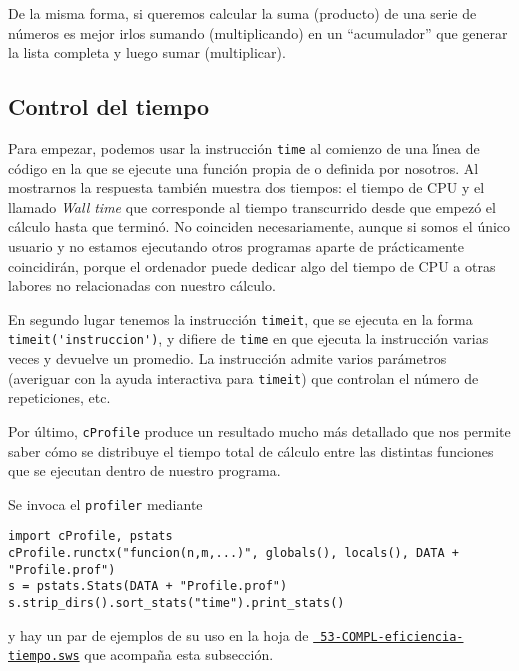 De la misma forma, si queremos calcular la suma (producto) de una serie de
n\'umeros es mejor irlos sumando (multiplicando) en un ``acumulador'' que
generar la lista
completa y luego sumar (multiplicar). 
 
 \subsection{Control del tiempo}\label{time}

Para empezar, podemos usar la instrucción \lstinline|time| al comienzo de una
l\'{\i}nea de c\'odigo en la que se ejecute una funci\'on propia de {\sage} o
definida por nosotros. Al mostrarnos la respuesta también muestra dos
tiempos: el tiempo de CPU y el llamado {\itshape Wall time} que corresponde al
tiempo transcurrido desde que empez\'o el c\'alculo hasta que termin\'o. No
coinciden necesariamente, aunque si somos el \'unico usuario y no estamos
ejecutando otros programas aparte de {\sage} pr\'acticamente coincidir\'an,  
porque el ordenador puede dedicar algo del tiempo de CPU a otras labores no
relacionadas con nuestro c\'alculo.




En segundo lugar tenemos la instrucci\'on \lstinline|timeit|, que se ejecuta en
la
forma 
\lstinline|timeit('instruccion')|, y difiere de \lstinline|time| en que ejecuta
la
instrucci\'on
varias veces y devuelve un promedio. La instrucci\'on admite varios par\'ametros
(averiguar con la ayuda interactiva para \lstinline|timeit|) que controlan el
n\'umero de
repeticiones, etc.

Por \'ultimo, \lstinline|cProfile| produce un resultado mucho m\'as detallado
que nos
permite saber 
c\'omo se distribuye el tiempo total de c\'alculo entre las distintas funciones
que se ejecutan dentro de nuestro programa. 



Se invoca el {\tt profiler} mediante

\begin{lstlisting}
import cProfile, pstats
cProfile.runctx("funcion(n,m,...)", globals(), locals(), DATA + "Profile.prof")
s = pstats.Stats(DATA + "Profile.prof")
s.strip_dirs().sort_stats("time").print_stats()
\end{lstlisting}
y hay un par de ejemplos de su uso en la hoja de {\sage} 
\href{http://sage.mat.uam.es:8888/home/pub/10/}{\tt
53-COMPL-eficiencia-tiempo.sws} que acompa\~na
esta subsecci\'on.







